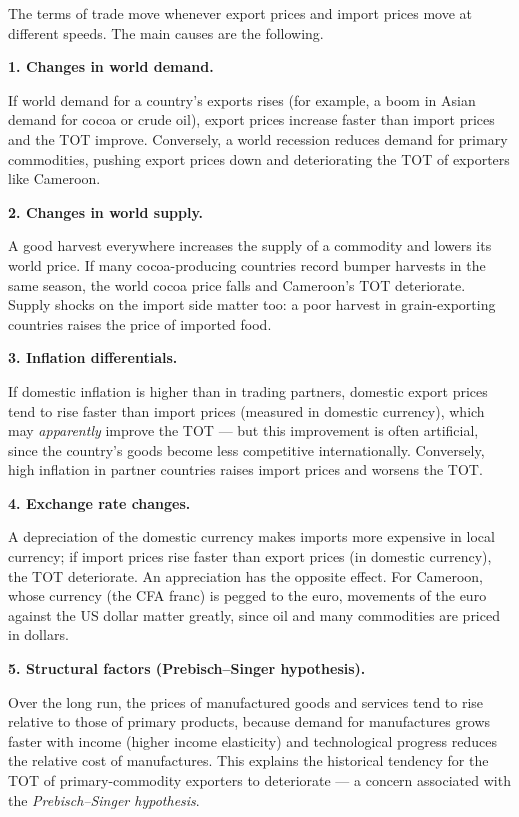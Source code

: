 \documentclass[11pt]{article}
\newcounter{popsec}
\newcounter{popsub}
\newcommand{\courssub}[1]{%
  \stepcounter{popsub}%
  \par\vspace{9pt}\noindent{\popxbold\fontsize{11.5}{13}\selectfont\color{popink}{\color{poporange}\thepopsec.\thepopsub}\hspace{6pt}#1}\par\nopagebreak\vspace{4pt}
}
\begin{document}
\courssub{Causes of Changes in the Terms of Trade}

The terms of trade move whenever export prices and import prices move at different speeds. The main causes are the following.

\textbf{1. Changes in world demand.}\par
If world demand for a country's exports rises (for example, a boom in Asian demand for cocoa or crude oil), export prices increase faster than import prices and the TOT improve. Conversely, a world recession reduces demand for primary commodities, pushing export prices down and deteriorating the TOT of exporters like Cameroon.

\textbf{2. Changes in world supply.}\par
A good harvest everywhere increases the supply of a commodity and lowers its world price. If many cocoa-producing countries record bumper harvests in the same season, the world cocoa price falls and Cameroon's TOT deteriorate. Supply shocks on the import side matter too: a poor harvest in grain-exporting countries raises the price of imported food.

\textbf{3. Inflation differentials.}\par
If domestic inflation is higher than in trading partners, domestic export prices tend to rise faster than import prices (measured in domestic currency), which may \emph{apparently} improve the TOT --- but this improvement is often artificial, since the country's goods become less competitive internationally. Conversely, high inflation in partner countries raises import prices and worsens the TOT.

\textbf{4. Exchange rate changes.}\par
A depreciation of the domestic currency makes imports more expensive in local currency; if import prices rise faster than export prices (in domestic currency), the TOT deteriorate. An appreciation has the opposite effect. For Cameroon, whose currency (the CFA franc) is pegged to the euro, movements of the euro against the US dollar matter greatly, since oil and many commodities are priced in dollars.

\textbf{5. Structural factors (Prebisch--Singer hypothesis).}\par
Over the long run, the prices of manufactured goods and services tend to rise relative to those of primary products, because demand for manufactures grows faster with income (higher income elasticity) and technological progress reduces the relative cost of manufactures. This explains the historical tendency for the TOT of primary-commodity exporters to deteriorate --- a concern associated with the \emph{Prebisch--Singer hypothesis}.
\end{document}
